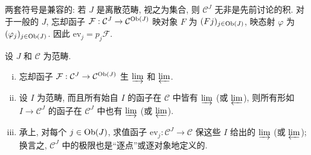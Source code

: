 两套符号是兼容的: 若 $J$ 是离散范畴, 视之为集合, 则 $\mathcal{C}^J$ 无非是先前讨论的积. 对于一般的 $J$, 忘却函子 $\mathcal{F}: \mathcal{C}^J \to \mathcal{C}^{\operatorname{Ob}(J)}$ 映对象 $F$ 为 $(Fj)_{j \in \operatorname{Ob}(J)}$, 映态射 $\varphi$ 为 $(\varphi_j)_{j \in \operatorname{Ob}(J)}$. 因此 $\mathrm{ev}_j = p_j \mathcal{F}$.

\begin{proposition}\label{prop:forget-create}
	设 $J$ 和 $\mathcal{C}$ 为范畴.
	\begin{enumerate}[(i)]
		\item 忘却函子 $\mathcal{F}: \mathcal{C}^J \to \mathcal{C}^{\operatorname{Ob}(J)}$ 生 $\varinjlim$ 和 $\varprojlim$.
		\item 设 $I$ 为范畴, 而且所有始自 $I$ 的函子在 $\mathcal{C}$ 中皆有 $\varinjlim$ (或 $\varprojlim$), 则所有形如 $I \to \mathcal{C}^J$ 的函子在 $\mathcal{C}^J$ 中也有 $\varinjlim$ (或 $\varprojlim$).
		\item 承上, 对每个 $j \in \operatorname{Ob}(J)$, 求值函子 $\mathrm{ev}_j: \mathcal{C}^J \to \mathcal{C}$ 保这些 $I$ 给出的 $\varinjlim$ (或 $\varprojlim$); 换言之, $\mathcal{C}^J$ 中的极限也是``逐点''或逐对象地定义的.
	\end{enumerate}
\end{proposition}
